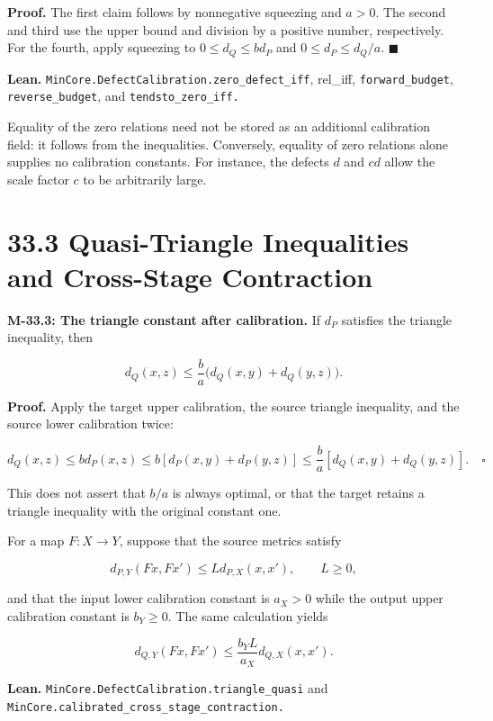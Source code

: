 \documentclass[
  english,
  11pt,
  oneside]{book}
\begin{document}
\textbf{Proof.} The first claim follows by nonnegative squeezing and \(a>0\). The second and third use the upper bound and division by a positive number, respectively. For the fourth, apply squeezing to \(0\le d_Q\le bd_P\) and \(0\le d_P\le d_Q/a\). \(\blacksquare\)

\textbf{Lean.} \nolinkurl{MinCore.DefectCalibration.zero_defect_iff}, rel\_iff, \nolinkurl{forward_budget}, \nolinkurl{reverse_budget}, and \nolinkurl{tendsto_zero_iff.}

Equality of the zero relations need not be stored as an additional calibration field: it follows from the inequalities. Conversely, equality of zero relations alone supplies no calibration constants. For instance, the defects \(d\) and \(cd\) allow the scale factor \(c\) to be arbitrarily large.

\section{33.3 Quasi-Triangle Inequalities and Cross-Stage Contraction}\label{quasi-triangle-inequalities-and-cross-stage-contraction}

\hypertarget{m-33-3}{}\label{m-33-3}

\textbf{M-33.3: The triangle constant after calibration.} If \(d_P\) satisfies the triangle inequality, then

\[d_Q(x,z)\le\frac ba\bigl(d_Q(x,y)+d_Q(y,z)\bigr).\]

\textbf{Proof.} Apply the target upper calibration, the source triangle inequality, and the source lower calibration twice:

\[d_Q(x,z)\le b d_P(x,z)
\le b[d_P(x,y)+d_P(y,z)]
\le\frac ba[d_Q(x,y)+d_Q(y,z)].\quad\square\]

This does not assert that \(b/a\) is always optimal, or that the target retains a triangle inequality with the original constant one.

For a map \(F:X\to Y\), suppose that the source metrics satisfy

\[d_{P,Y}(Fx,Fx')\le Ld_{P,X}(x,x'),\qquad L\ge0,\]

and that the input lower calibration constant is \(a_X>0\) while the output upper calibration constant is \(b_Y\ge0\). The same calculation yields

\[d_{Q,Y}(Fx,Fx')\le\frac{b_YL}{a_X}d_{Q,X}(x,x').\]

\textbf{Lean.} \nolinkurl{MinCore.DefectCalibration.triangle_quasi} and \nolinkurl{MinCore.calibrated_cross_stage_contraction.}
\end{document}
